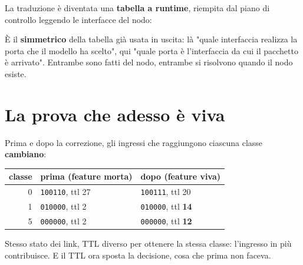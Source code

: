 \documentclass[11pt,a4paper,oneside]{report}
\begin{document}
La traduzione è diventata una \textbf{tabella a runtime}, riempita dal piano di
controllo leggendo le interfacce del nodo:

\begin{center}
\end{center}

È il \textbf{simmetrico} della tabella già usata in uscita: là "quale
interfaccia realizza la porta che il modello ha scelto", qui "quale porta è
l'interfaccia da cui il pacchetto è arrivato". Entrambe sono fatti del nodo,
entrambe si risolvono quando il nodo esiste.

\section{La prova che adesso è viva}

Prima e dopo la correzione, gli ingressi che raggiungono ciascuna classe
\textbf{cambiano}:

\begin{center}
\small
\begin{tabular}{@{}rll@{}}
\toprule
\textbf{classe} & \textbf{prima} (feature morta) & \textbf{dopo} (feature viva) \\
\midrule
0 & \texttt{100110}, ttl 27 & \texttt{100111}, ttl 20 \\
1 & \texttt{010000}, ttl 2  & \texttt{010000}, ttl \textbf{14} \\
5 & \texttt{000000}, ttl 2  & \texttt{000000}, ttl \textbf{12} \\
\bottomrule
\end{tabular}
\end{center}

Stesso stato dei link, TTL diverso per ottenere la stessa classe: l'ingresso in
più contribuisce. E il TTL ora sposta la decisione, cosa che prima non faceva.
\end{document}
